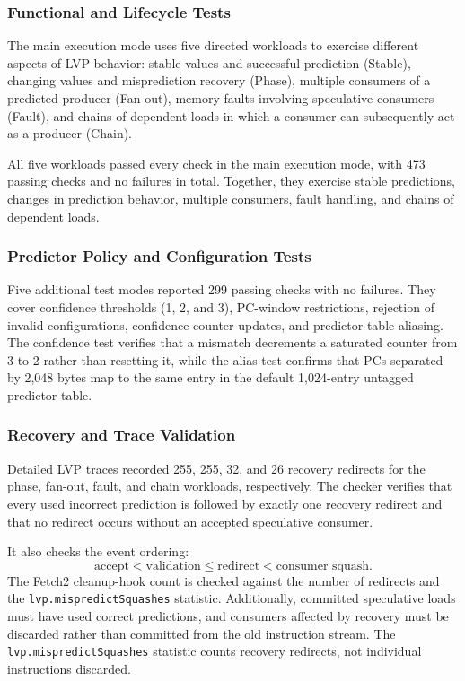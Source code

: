 \subsubsection{Functional and Lifecycle Tests}

The main execution mode uses five directed workloads to exercise
different aspects of LVP behavior: stable values and successful
prediction (Stable), changing values and misprediction recovery
(Phase), multiple consumers of a predicted producer (Fan-out),
memory faults involving speculative consumers (Fault), and chains
of dependent loads in which a consumer can subsequently act as a
producer (Chain).

All five workloads passed every check in the main execution mode, with
473 passing checks and no failures in total. Together, they exercise
stable predictions, changes in prediction behavior, multiple
consumers, fault handling, and chains of dependent loads.

\subsubsection{Predictor Policy and Configuration Tests}

Five additional test modes reported 299 passing checks with no
failures. They cover confidence thresholds (1, 2, and 3), PC-window
restrictions, rejection of invalid configurations, confidence-counter
updates, and predictor-table aliasing. The confidence test verifies
that a mismatch decrements a saturated counter from 3 to 2 rather
than resetting it, while the alias test confirms that PCs separated
by 2,048 bytes map to the same entry in the default 1,024-entry
untagged predictor table.

\subsubsection{Recovery and Trace Validation}

Detailed LVP traces recorded 255, 255, 32, and 26 recovery
redirects for the phase, fan-out, fault, and chain workloads,
respectively. The checker verifies that every used incorrect
prediction is followed by exactly one recovery redirect and that
no redirect occurs without an accepted speculative consumer.

It also checks the event ordering:
\[
    \text{accept}
    <
    \text{validation}
    \leq
    \text{redirect}
    <
    \text{consumer squash}.
\]
The Fetch2 cleanup-hook count is checked against the number of
redirects and the \texttt{lvp.mispredictSquashes} statistic.
Additionally, committed speculative loads must have used correct
predictions, and consumers affected by recovery must be discarded
rather than committed from the old instruction stream. The
\texttt{lvp.mispredictSquashes} statistic counts recovery redirects,
not individual instructions discarded.

